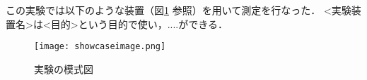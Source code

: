 この実験では以下のような装置（図\ref{fig:experiment-blender-nbg} 参照）を用いて測定を行なった．
<実験装置名>は<目的>という目的で使い，....ができる．

\begin{figure}[H]\centering
  \texttt{[image: showcaseimage.png]}
  \caption{実験の模式図}
  \label{fig:experiment-blender-nbg}
\end{figure}
